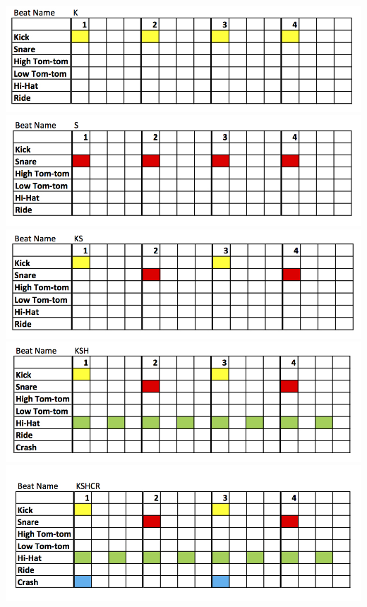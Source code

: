 \documentclass[a4paper, 11pt]{article}
\begin{document}
\begin{center}
\includegraphics[scale=0.3]{images/K.jpg}\\
\includegraphics[scale=0.3]{images/S.jpg}\\
\includegraphics[scale=0.3]{images/KS.jpg}\\
\includegraphics[scale=0.3]{images/KSH.jpg}\\
\includegraphics[scale=0.3]{images/KSHCR.jpg}\\

\end{center}
\end{document}
